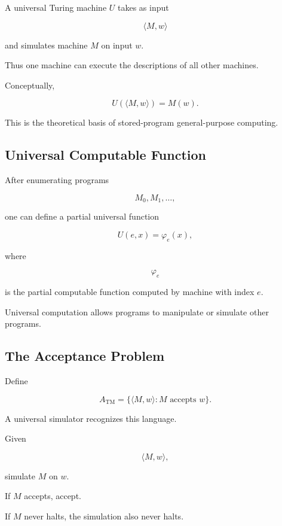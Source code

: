 A universal Turing machine \(U\) takes as input

\[
\boxed{
\langle M,w\rangle
}
\]

and simulates machine \(M\) on input \(w\).

Thus one machine can execute the descriptions of all other machines.

Conceptually,

\[
\boxed{
U(\langle M,w\rangle)
=
M(w).
}
\]

This is the theoretical basis of stored-program general-purpose computing.

\subsection{Universal Computable Function}
\label{subsec:universal-computable-function}

After enumerating programs

\[
M_0,M_1,\ldots,
\]

one can define a partial universal function

\[
\boxed{
U(e,x)
=
\varphi_e(x),
}
\]

where

\[
\varphi_e
\]

is the partial computable function computed by machine with index \(e\).

Universal computation allows programs to manipulate or simulate other
programs.

\subsection{The Acceptance Problem}
\label{subsec:acceptance-problem}

Define

\[
\boxed{
A_{\mathrm{TM}}
=
\{
\langle M,w\rangle:
M
\text{ accepts }w
\}.
}
\]

A universal simulator recognizes this language.

Given

\[
\langle M,w\rangle,
\]

simulate \(M\) on \(w\).

If \(M\) accepts, accept.

If \(M\) never halts, the simulation also never halts.


